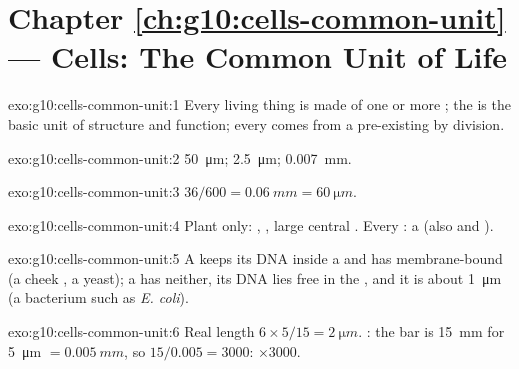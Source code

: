 \section*{Chapter \ref{ch:g10:cells-common-unit} --- Cells: The Common Unit of Life}

\begin{solution}{exo:g10:cells-common-unit:1}
Every living thing is made of one or more ; the  is the basic
unit of structure and function; every  comes from a pre-existing
 by division.
\end{solution}

\begin{solution}{exo:g10:cells-common-unit:2}
\qty{50}{\micro m}; \qty{2.5}{\micro m}; \qty{0.007}{mm}.
\end{solution}

\begin{solution}{exo:g10:cells-common-unit:3}
$36/600 = \qty{0.06}{mm} = \qty{60}{\micro m}$.
\end{solution}

\begin{solution}{exo:g10:cells-common-unit:4}
Plant only: , , large central . Every :
a  (also  and ).
\end{solution}

\begin{solution}{exo:g10:cells-common-unit:5}
A  keeps its DNA inside a  and has
membrane-bound  (a cheek , a yeast); a 
has neither, its DNA lies free in the , and it is about
\qty{1}{\micro m} (a bacterium such as \emph{E. coli}).
\end{solution}

\begin{solution}{exo:g10:cells-common-unit:6}
Real length $6 \times 5/15 = \qty{2}{\micro m}$. : the bar
is \qty{15}{mm} for \qty{5}{\micro m} $= \qty{0.005}{mm}$, so
$15/0.005 = 3000$: $\times 3000$.
\end{solution}

